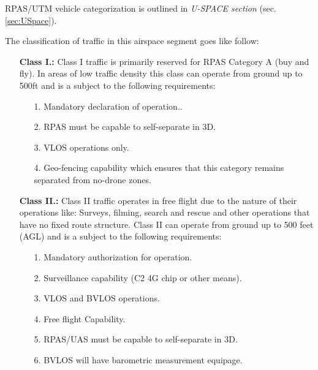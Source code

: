 \begin{note}
    RPAS/UTM vehicle categorization is outlined in \emph{U-SPACE section} (sec. \ref{sec:USpace}).
\end{note}

\noindent The classification of traffic in this airspace segment goes like follow:

\begin{itemize}    
    \item[\textbf{Class I.:}] Class I traffic is primarily reserved for RPAS Category A (buy and fly). In areas of low traffic density this class can operate from ground up to 500ft and is a subject to the following requirements:
    \begin{itemize}
        \item[1.]  Mandatory declaration of operation..
        
        \item[2.]  RPAS must be capable to self-separate in 3D.
        
        \item[3.]  VLOS operations only.
        
        \item[4.]  Geo-fencing capability which ensures that this category remains separated from no-drone zones.
    \end{itemize}
    
    \item[\textbf{Class II.:}] Class II traffic operates in free flight due to the nature of their operations like: Surveys, filming, search and rescue and other operations that have no fixed route structure. Class II can operate from ground up to 500 feet (AGL) and is a subject to the following requirements:
    \begin{itemize}
        \item[1.] Mandatory authorization for operation.
        
        \item[2.] Surveillance capability (C2 4G chip or other means).
        
        \item[3.] VLOS and BVLOS operations.
        
        \item[4.]  Free flight Capability.
        
        \item[5.]  RPAS/UAS must be capable to self-separate in 3D.
        
        \item[6.]  BVLOS will have barometric measurement equipage.
    \end{itemize}
    

\end{itemize}

